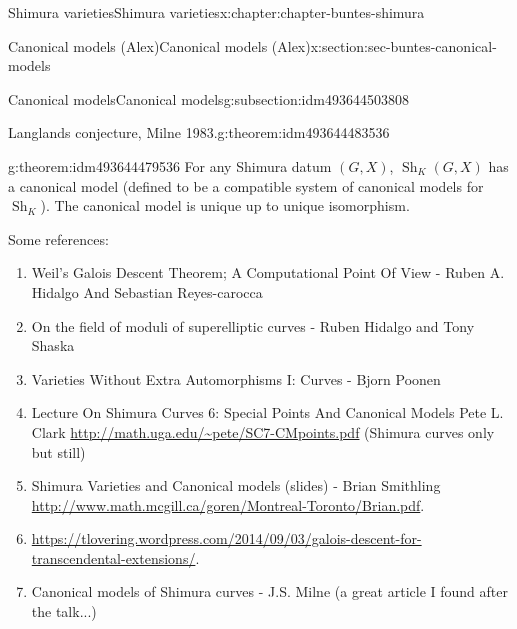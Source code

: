 \documentclass[oneside,10pt,]{book}
\numberwithin{equation}{section}
\begin{document}
\begin{chapterptx}{Shimura varieties}{}{Shimura varieties}{}{}{x:chapter:chapter-buntes-shimura}
\begin{sectionptx}{Canonical models (Alex)}{}{Canonical models (Alex)}{}{}{x:section:sec-buntes-canonical-models}
\begin{subsectionptx}{Canonical models}{}{Canonical models}{}{}{g:subsection:idm493644503808}
\begin{theorem}{Langlands conjecture, Milne 1983.}{}{g:theorem:idm493644483536}
\end{theorem}
\begin{theorem}{}{}{g:theorem:idm493644479536}%
For any Shimura datum \((G,X)\), \({\operatorname{Sh}}_K(G,X)\) has a canonical model (defined to be a compatible system of canonical models for \({\operatorname{Sh}}_K\)). The canonical model is unique up to unique isomorphism.%
\end{theorem}
Some references:%
\begin{enumerate}
\item{}Weil’s Galois Descent Theorem; A Computational Point Of View - Ruben A. Hidalgo And Sebastian Reyes-carocca%
\item{}On the field of moduli of superelliptic curves - Ruben Hidalgo and Tony Shaska%
\item{}Varieties Without Extra Automorphisms I: Curves - Bjorn Poonen%
\item{}Lecture On Shimura Curves 6: Special Points And Canonical Models Pete L. Clark \url{http://math.uga.edu/\~pete/SC7-CMpoints.pdf} (Shimura curves only but still)%
\item{}Shimura Varieties and Canonical models (slides) - Brian Smithling \url{http://www.math.mcgill.ca/goren/Montreal-Toronto/Brian.pdf}.%
\item{}\url{https://tlovering.wordpress.com/2014/09/03/galois-descent-for-transcendental-extensions/}.%
\item{}Canonical models of Shimura curves -  J.S. Milne (a great article I found after the talk...)%
\end{enumerate}
%
\end{subsectionptx}
\end{sectionptx}
\end{chapterptx}
%
%
\typeout{************************************************}
\typeout{************************************************}
%
\end{document}
